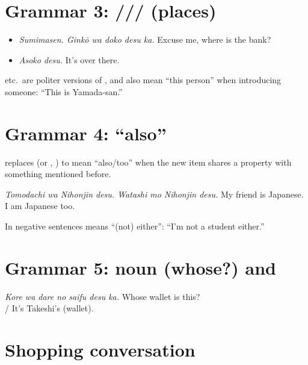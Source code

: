 \section{Grammar 3: /// (places)}
\begin{example}
\leavevmode
\begin{itemize}
  \item[A:]  \emph{Sumimasen. Ginkō wa doko desu ka.}
        Excuse me, where is the bank?
  \item[B:]  \emph{Asoko desu.} It's over there.
\end{itemize}
\end{example}
 etc.\ are politer versions of , and also mean ``this person'' when
introducing someone:  ``This is Yamada-san.''

\section{Grammar 4:  ``also''}

 replaces  (or , ) to mean ``also/too'' when the new item
shares a property with something mentioned before.
\begin{example}
\emph{Tomodachi wa Nihonjin desu. Watashi mo Nihonjin desu.}
My friend is Japanese. I am Japanese too.
\end{example}
\begin{important}
In negative sentences  means ``(not) either'':
 ``I'm not a student either.''
\end{important}

\section{Grammar 5: noun  (whose?) and }
\begin{example}
 \emph{Kore wa dare no saifu desu ka.}
Whose wallet is this?\\
 / 
It's Takeshi's (wallet).
\end{example}

\section{Shopping conversation}

